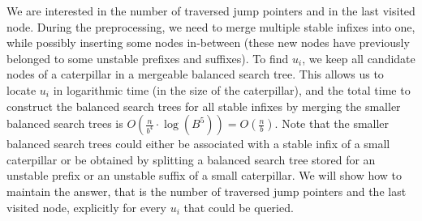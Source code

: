 \documentclass[11pt,a4paper]{article}
\theoremstyle{definition}
\theoremstyle{remark}
\begin{document}
We are interested in the number of traversed jump pointers and in the last visited node.
During the preprocessing, we need to merge multiple stable infixes
into one, while possibly inserting some nodes in-between (these new nodes have previously
belonged to some unstable prefixes and suffixes). To find $u_{i}$, we keep all candidate
nodes of a caterpillar in a mergeable balanced search tree. This allows us to locate $u_{i}$
in logarithmic time (in the size of the caterpillar), and the total time to construct the balanced
search trees for all stable infixes by merging the smaller balanced search trees
is $O(\frac{n}{b^{4}}\cdot \log (B^{5}))=O(\frac{n}{b})$. Note that the smaller balanced search
trees could either be associated with a stable infix of a small caterpillar or be obtained
by splitting a balanced search tree stored for an unstable prefix or an unstable suffix of
a small caterpillar.
We will show how to maintain the answer, that is the number of traversed jump pointers and the
last visited node, explicitly for every $u_{i}$ that could be queried.
\end{document}
